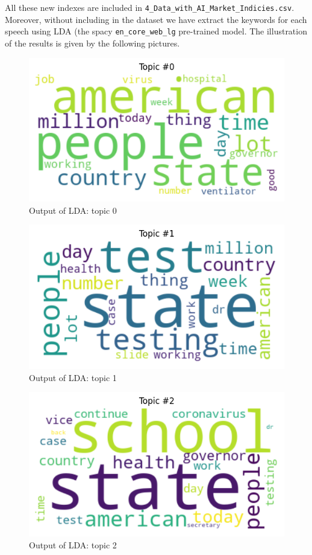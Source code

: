 \documentclass{article}
\begin{document}
All these new indexes are included in \texttt{4\_Data\_with\_AI\_Market\_Indicies.csv}. Moreover, without including in the dataset we have extract the keywords for each speech using LDA (the spacy \texttt{en\_core\_web\_lg} pre-trained model. The illustration of the results is given by the following pictures.
\begin{figure}
    \centering
    \includegraphics[scale=0.8]{output.png}
    \caption{Output of LDA: topic 0}
    \label{fig:lda}
\end{figure}
\begin{figure}
    \centering
    \includegraphics[scale=0.8]{output1.png}
    \caption{Output of LDA: topic 1}
    \label{fig:lda1}
\end{figure}
\begin{figure}
    \centering
    \includegraphics[scale=0.8]{output2.png}
    \caption{Output of LDA: topic 2}
    \label{fig:lda2}
\end{figure}
\end{document}
